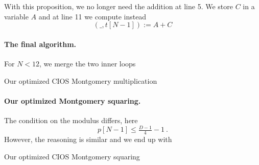 \documentclass[journal=tches,spthm]{iacrtrans}
\begin{document}
With this proposition, we no longer need the addition at line 5. We store $C$
in a variable $A$ and at line 11 we compute instead
$$ (\_,t[N-1]) := A + C $$

\paragraph{The final algorithm.} For $N < 12$, we merge the two inner loops
%
\begin{algorithm}[hbt]
    \SetAlgoLined
  \caption{Our optimized CIOS Montgomery multiplication}
  \label{alg:opt-cios-mont-mul}
\end{algorithm}

\paragraph{Our optimized Montgomery squaring.}
The condition on the modulus differs, here
$$ p[N-1] \leq \tfrac{D-1}{4} - 1~.$$
However, the reasoning is similar and we end up with
%
\begin{algorithm}[hbt]
    \SetAlgoLined
  \caption{Our optimized CIOS Montgomery squaring}
  \label{alg:opt-cios-mont-sq}
\end{algorithm}



\end{document}

